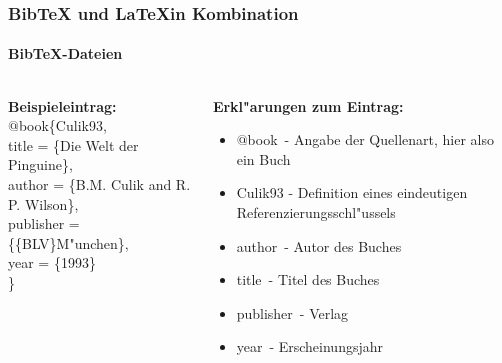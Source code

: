 
\begin{frame}
\frametitle{BibTeX und \LaTeX in Kombination}
\framesubtitle{BibTeX-Dateien}
\begin{columns}
\hspace*{5mm}
\begin{column}{0.45\textwidth}
\textbf{Beispieleintrag:}\\[1em]

\color{nounibaredI}$@$book\color{black}\{Culik93,\\
\color{nounibaredI}title\color{black} = \{Die Welt der Pinguine\},\\
\color{nounibaredI}author\color{black} = \{B.M. Culik and R. P. Wilson\},\\
\color{nounibaredI}publisher\color{black} = \{\{BLV\}M"unchen\},\\
\color{nounibaredI}year\color{black} = \{1993\}\\
\}
\end{column}
\begin{column}{0.55\textwidth}
\textbf{Erkl"arungen zum Eintrag:}
\begin{itemize}
\item \color{nounibaredI}$@$book\color{black}~- Angabe der Quellenart, hier also ein Buch
\item Culik93 - Definition eines eindeutigen Referenzierungsschl"ussels
\item \color{nounibaredI}author\color{black}~- Autor des Buches
\item \color{nounibaredI}title\color{black}~- Titel des Buches
\item \color{nounibaredI}publisher\color{black}~- Verlag
\item \color{nounibaredI}year\color{black}~- Erscheinungsjahr
\end{itemize}
\end{column}
\end{columns}

\end{frame}


